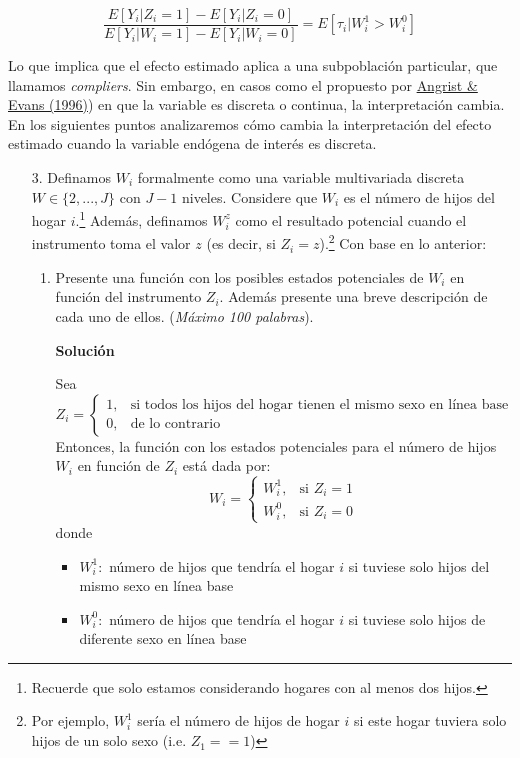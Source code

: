 \documentclass[a4paper, answers, addpoints, 11pt]{exam}
\newenvironment{solucion}{%
  \begin{mdframed}[
    backgroundcolor=blue!5,    %
    linecolor=blue!50,          %
    linewidth=2pt,              %
    leftmargin=10pt,            %
    rightmargin=8pt,           %
    topline=true,              %
    bottomline=true,            %
    roundcorner=10pt,           %
    innerleftmargin=10pt,       %
    innerrightmargin=10pt,      %
    innerbottommargin=10pt,     %
    innertopmargin=10pt         %
  ]%
  \begin{tcolorbox}[colframe=blue!50!black, colback=blue!50, coltitle=white, sharp corners=all, boxrule=1mm, width=\textwidth, halign=left, valign=center, top=0mm, bottom=0mm, left=0mm, right=0mm] \textbf{Solución} \end{tcolorbox} }{\end{mdframed}}
\begin{document}
    \begin{equation} \label{wald}
        \frac{E[Y_i| Z_i = 1] - E[Y_i| Z_i = 0]}{E[Y_i| W_i = 1] - E[Y_i| W_i = 0]} = E[\tau_i | W_i^1 > W_i^0]
    \end{equation}


\bigbreak
Lo que implica que el efecto estimado aplica a una subpoblación particular, que llamamos \textit{compliers}. Sin embargo, en casos como el propuesto por \href{https://www.nber.org/system/files/working_papers/w5778/w5778.pdf}{Angrist \& Evans (1996)}) en que la variable es discreta o continua, la interpretación cambia. En los siguientes puntos analizaremos cómo cambia la interpretación del efecto estimado cuando la variable endógena de interés es discreta.

\begin{enumerate}
    \item[3.] Definamos $W_i$ formalmente como una variable multivariada discreta $W \in \{2,...,J\}$ con $J-1$ niveles. Considere que $W_i$ es el número de hijos del hogar $i$.\footnote{\footnotesize{Recuerde que solo estamos considerando hogares con al menos dos hijos.}} Además, definamos $W_i^z$ como el resultado potencial cuando el instrumento toma el valor $z$ (es decir, si $Z_i = z$).\footnote{\footnotesize{Por ejemplo, $W_i^1$ sería el número de hijos de hogar $i$ si este hogar tuviera solo hijos de un solo sexo (i.e. $Z_1 == 1$)}} Con base en lo anterior:

    
        \begin{enumerate}

            \item Presente una función con los posibles estados potenciales de $W_i$ en función del instrumento $Z_i$. Además presente una breve descripción de cada uno de ellos. (\textit{Máximo 100 palabras}).

            \begin{solucion}
            Sea  \begin{equation*}
    Z_i = \begin{cases} 1, & \text{si todos los 
 hijos del hogar tienen el mismo sexo en línea base}  \\ 0, & \text{de lo contrario}   \end{cases}
\end{equation*}
            Entonces, la función con los estados potenciales para el número de hijos $W_i$ en función de $Z_i$ está dada por:
            \begin{equation*}
    W_i = \begin{cases} W_i^1, & \text{si } Z_i=1  \\ W_i^0, & \text{si } Z_i=0  \end{cases}
\end{equation*}
donde 
\begin{itemize}
    \item  $W_i^1:$ número de hijos que tendría el hogar $i$ si tuviese solo hijos del mismo sexo en línea base 
    \item  $W_i^0:$ número de hijos que tendría el hogar $i$ si tuviese solo hijos de diferente sexo en línea base 
\end{itemize}
\end{solucion}


\end{enumerate}
\end{enumerate}
\end{document}
